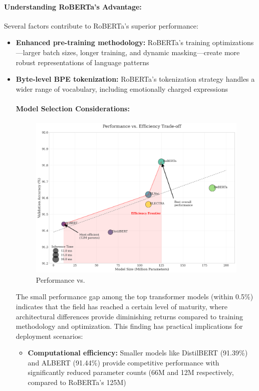 \documentclass[12pt]{article}
\begin{document}
\paragraph{Understanding RoBERTa's Advantage:}
Several factors contribute to RoBERTa's superior performance:
\begin{itemize}
    \item \textbf{Enhanced pre-training methodology:} RoBERTa's training optimizations—larger batch sizes, longer training, and dynamic masking—create more robust representations of language patterns

    \item \textbf{Byte-level BPE tokenization:} RoBERTa's tokenization strategy handles a wider range of vocabulary, including emotionally charged expressions

\paragraph{Model Selection Considerations:}
\begin{figure}[h]
    \centering
    \includegraphics[width=0.9\linewidth]{Figures/performance_efficiency_tradeoff.png}
    \caption{Performance vs.}
    \label{fig:efficiency_tradeoff}
\end{figure}

The small performance gap among the top transformer models (within 0.5\%) indicates that the field has reached a certain level of maturity, where architectural differences provide diminishing returns compared to training methodology and optimization. This finding has practical implications for deployment scenarios:

\begin{itemize}
    \item \textbf{Computational efficiency:} Smaller models like DistilBERT (91.39\%) and ALBERT (91.44\%) provide competitive performance with significantly reduced parameter counts (66M and 12M respectively, compared to RoBERTa's 125M)


\end{itemize}
\end{itemize}
\end{document}
